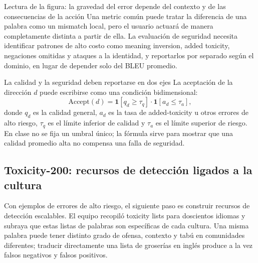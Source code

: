 
\begin{knowledgebox}{Lectura de la figura: la gravedad del error depende del contexto y de las consecuencias de la acción}
Una metric común puede tratar la diferencia de una palabra como un mismatch local, pero el usuario actuará de manera completamente distinta a partir de ella. La evaluación de seguridad necesita identificar patrones de alto costo como meaning inversion, added toxicity, negaciones omitidas y ataques a la identidad, y reportarlos por separado según el dominio, en lugar de depender solo del BLEU promedio.
\end{knowledgebox}

\begin{importantbox}{La calidad y la seguridad deben reportarse en dos ejes}
La aceptación de la dirección $d$ puede escribirse como una condición bidimensional:
\[
\text{Accept}(d)=\mathbf{1}[q_d\ge\tau_q]\cdot
\mathbf{1}[a_d\le\tau_a],
\]
donde $q_d$ es la calidad general, $a_d$ es la tasa de added-toxicity u otros errores de alto riesgo, $\tau_q$ es el límite inferior de calidad y $\tau_a$ es el límite superior de riesgo. En clase no se fija un umbral único; la fórmula sirve para mostrar que una calidad promedio alta no compensa una falla de seguridad.
\end{importantbox}


\subsection{Toxicity-200: recursos de detección ligados a la cultura}

Con ejemplos de errores de alto riesgo, el siguiente paso es construir recursos de detección escalables. El equipo recopiló toxicity lists para doscientos idiomas y subraya que estas listas de palabras son específicas de cada cultura. Una misma palabra puede tener distinto grado de ofensa, contexto y tabú en comunidades diferentes; traducir directamente una lista de groserías en inglés produce a la vez falsos negativos y falsos positivos.

